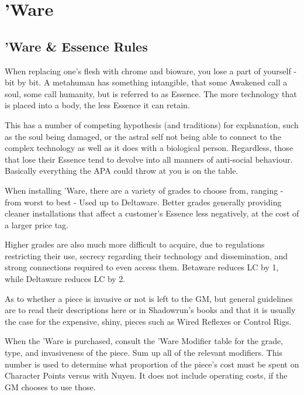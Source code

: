 \section{'Ware}

\begin{multicols*}{3}
	
	\subsection{'Ware \& Essence Rules}
	
	When replacing one's flesh with chrome and bioware, you lose a part of yourself - bit by bit. A metahuman has something intangible, that some Awakened call a soul, some call humanity, but is referred to as Essence. The more technology that is placed into a body, the less Essence it can retain. 
	
	This has a number of competing hypothesis (and traditions) for explanation, such as the soul being damaged, or the astral self not being able to connect to the complex technology as well as it does with a biological person. Regardless, those that lose their Essence tend to devolve into all manners of anti-social behaviour. Basically everything the APA could throw at you is on the table.
	
	When installing 'Ware, there are a variety of grades to choose from, ranging - from worst to best - Used up to Deltaware. Better grades generally providing cleaner installations that affect a customer's Essence less negatively, at the cost of a larger price tag. 
	
	Higher grades are also much more difficult to acquire, due to regulations restricting their use, secrecy regarding their technology and dissemination, and strong connections required to even access them. Betaware reduces LC by 1, while Deltaware reduces LC by 2.
	
	As to whether a piece is invasive or not is left to the GM, but general guidelines are to read their descriptions here or in Shadowrun's books and that it is usually the case for the expensive, shiny, pieces such as Wired Reflexes or Control Rigs.
	
	When the 'Ware is purchased, consult the 'Ware Modifier table for the grade, type, and invasiveness of the piece. Sum up all of the relevant modifiers. This number is used to determine what proportion of the piece's cost must be spent on Character Points versus with Nuyen. It does not include operating costs, if the GM chooses to use those.
	

\end{multicols*}
